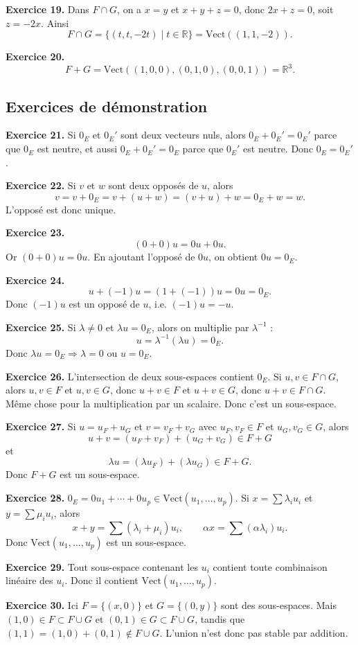 \documentclass[11pt,a4paper]{article}
\newcommand{\R}{\mathbb R}
\newcommand{\Vect}{\mathrm{Vect}}
\begin{document}
\textbf{Exercice 19.} Dans $F\cap G$, on a $x=y$ et $x+y+z=0$, donc $2x+z=0$, soit $z=-2x$. Ainsi
\[F\cap G=\{(t,t,-2t)\mid t\in\R\}=\Vect((1,1,-2)).\]

\textbf{Exercice 20.} 
\[F+G=\Vect((1,0,0),(0,1,0),(0,0,1))=\R^3.\]

\subsection*{Exercices de démonstration}
\textbf{Exercice 21.} Si $0_E$ et $0_E'$ sont deux vecteurs nuls, alors $0_E+0_E'=0_E'$ parce que $0_E$ est neutre, et aussi $0_E+0_E'=0_E$ parce que $0_E'$ est neutre. Donc $0_E=0_E'$.

\textbf{Exercice 22.} Si $v$ et $w$ sont deux opposés de $u$, alors
\[v=v+0_E=v+(u+w)=(v+u)+w=0_E+w=w.\]
L'opposé est donc unique.

\textbf{Exercice 23.} 
\[(0+0)u=0u+0u.\]
Or $(0+0)u=0u$. En ajoutant l'opposé de $0u$, on obtient $0u=0_E$.

\textbf{Exercice 24.} 
\[u+(-1)u=(1+(-1))u=0u=0_E.\]
Donc $(-1)u$ est un opposé de $u$, i.e. $(-1)u=-u$.

\textbf{Exercice 25.} Si $\lambda\neq 0$ et $\lambda u=0_E$, alors on multiplie par $\lambda^{-1}$ :
\[u=\lambda^{-1}(\lambda u)=0_E.\]
Donc $\lambda u=0_E\Rightarrow \lambda=0$ ou $u=0_E$.

\textbf{Exercice 26.} L'intersection de deux sous-espaces contient $0_E$. Si $u,v\in F\cap G$, alors $u,v\in F$ et $u,v\in G$, donc $u+v\in F$ et $u+v\in G$, donc $u+v\in F\cap G$. Même chose pour la multiplication par un scalaire. Donc c'est un sous-espace.

\textbf{Exercice 27.} Si $u=u_F+u_G$ et $v=v_F+v_G$ avec $u_F,v_F\in F$ et $u_G,v_G\in G$, alors
\[u+v=(u_F+v_F)+(u_G+v_G)\in F+G\]
et
\[\lambda u=(\lambda u_F)+(\lambda u_G)\in F+G.\]
Donc $F+G$ est un sous-espace.

\textbf{Exercice 28.} $0_E=0u_1+\cdots+0u_p\in\Vect(u_1,\dots,u_p)$. Si $x=\sum\lambda_i u_i$ et $y=\sum\mu_i u_i$, alors
\[x+y=\sum (\lambda_i+\mu_i)u_i,\qquad \alpha x=\sum (\alpha\lambda_i)u_i.\]
Donc $\Vect(u_1,\dots,u_p)$ est un sous-espace.

\textbf{Exercice 29.} Tout sous-espace contenant les $u_i$ contient toute combinaison linéaire des $u_i$. Donc il contient $\Vect(u_1,\dots,u_p)$.

\textbf{Exercice 30.} Ici $F=\{(x,0)\}$ et $G=\{(0,y)\}$ sont des sous-espaces. Mais $(1,0)\in F\subset F\cup G$ et $(0,1)\in G\subset F\cup G$, tandis que $(1,1)=(1,0)+(0,1)\notin F\cup G$. L'union n'est donc pas stable par addition.
\end{document}
